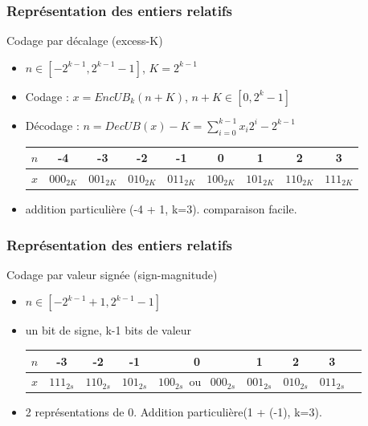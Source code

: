 \documentclass{beamer}
\begin{document}
\begin{frame}
\frametitle{Représentation des entiers relatifs}
\begin{small}
\begin{block}{Codage par décalage (excess-K)}
\begin{itemize}
\item $n \in [-2^{k-1}, 2^{k-1}-1]$, $K = 2^{k-1}$
\item Codage : $x = EncUB_k(n + K)$, $n+K \in [0, 2^k -1]$
\item Décodage : $n = DecUB(x) - K = \sum_{i=0}^{k-1} x_i 2^i - 2^{k-1}$
  \begin{center}
\begin{tabular}{c|c|c|c|c|c|c|c|c}
$n$ & -4 & -3 & -2& -1 & 0 & 1 & 2 & 3\\
\hline
$x$ & $000_{2K}$ & $001_{2K}$ & $010_{2K}$ & $011_{2K}$ & $100_{2K}$ & $101_{2K}$ & $110_{2K}$ & $111_{2K}$
\end{tabular}
\end{center}
\item addition particulière (-4 + 1, k=3). comparaison facile.
\end{itemize}
\end{block}
\end{small}
\end{frame}

\begin{frame}
  \frametitle{Représentation des entiers relatifs}
  \begin{small}
\begin{block}{Codage par valeur signée (sign-magnitude)}
\begin{itemize}
\item $n \in [-2^{k-1}+1, 2^{k-1}-1]$
\item un bit de signe, k-1 bits de valeur
 \begin{center}
\begin{tabular}{c|c|c|c|c|c|c|c|c}
$n$ & -3 & -2& -1 & 0 & 1 & 2 & 3 \\
\hline
$x$ & $111_{2s}$ & $110_{2s}$ & $101_{2s}$ & $100_{2s}$\mbox{ ou } $000_{2s}$ & $001_{2s}$ & $010_{2s}$ & $011_{2s}$
\end{tabular}
\end{center} 
\item 2 représentations de 0. Addition particulière(1 + (-1), k=3).
\end{itemize}
\end{block}
\end{small}
\end{frame}
\end{document}
